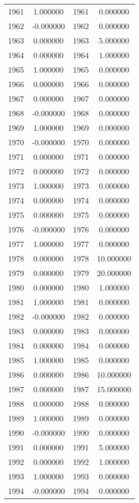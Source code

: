 \documentclass[12pt]{article}
\begin{document}
\begin{longtable}{@{}cccc@{}}
1961 & 1.000000 & 1961 & 0.000000 \\
1962 & -0.000000 & 1962 & 0.000000 \\
1963 & 0.000000 & 1963 & 5.000000 \\
1964 & 0.000000 & 1964 & 1.000000 \\
1965 & 1.000000 & 1965 & 0.000000 \\
1966 & 0.000000 & 1966 & 0.000000 \\
1967 & 0.000000 & 1967 & 0.000000 \\
1968 & -0.000000 & 1968 & 0.000000 \\
1969 & 1.000000 & 1969 & 0.000000 \\
1970 & -0.000000 & 1970 & 0.000000 \\
1971 & 0.000000 & 1971 & 0.000000 \\
1972 & 0.000000 & 1972 & 0.000000 \\
1973 & 1.000000 & 1973 & 0.000000 \\
1974 & 0.000000 & 1974 & 0.000000 \\
1975 & 0.000000 & 1975 & 0.000000 \\
1976 & -0.000000 & 1976 & 0.000000 \\
1977 & 1.000000 & 1977 & 0.000000 \\
1978 & 0.000000 & 1978 & 10.000000 \\
1979 & 0.000000 & 1979 & 20.000000 \\
1980 & 0.000000 & 1980 & 1.000000 \\
1981 & 1.000000 & 1981 & 0.000000 \\
1982 & -0.000000 & 1982 & 0.000000 \\
1983 & 0.000000 & 1983 & 0.000000 \\
1984 & 0.000000 & 1984 & 0.000000 \\
1985 & 1.000000 & 1985 & 0.000000 \\
1986 & 0.000000 & 1986 & 10.000000 \\
1987 & 0.000000 & 1987 & 15.000000 \\
1988 & 0.000000 & 1988 & 0.000000 \\
1989 & 1.000000 & 1989 & 0.000000 \\
1990 & -0.000000 & 1990 & 0.000000 \\
1991 & 0.000000 & 1991 & 5.000000 \\
1992 & 0.000000 & 1992 & 1.000000 \\
1993 & 1.000000 & 1993 & 0.000000 \\
1994 & -0.000000 & 1994 & 0.000000 \\

\end{longtable}
\end{document}
